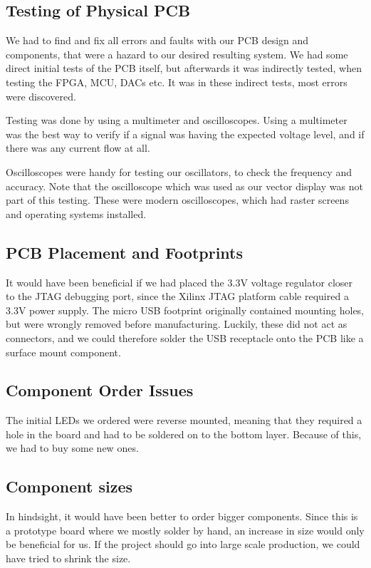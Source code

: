 \subsection{Testing of Physical PCB}
We had to find and fix all errors and faults with our PCB design and components, that were a hazard to our desired resulting system.  
We had some direct initial tests of the PCB itself, but afterwards it was indirectly tested, when testing the FPGA, MCU, DACs etc. It was in these indirect tests, most errors were discovered.

Testing was done by using a multimeter and oscilloscopes. Using a multimeter was the best way to verify if a signal was having the expected voltage level, and if there was any current flow at all.

Oscilloscopes were handy for testing our oscillators, to check the frequency and accuracy. Note that the oscilloscope which was used as our vector display was not part of this testing. These were modern oscilloscopes, which had raster screens and operating systems installed.

\subsection{PCB Placement and Footprints}


It would have been beneficial if we had placed the 3.3V voltage regulator closer to the JTAG debugging port, since the Xilinx JTAG platform cable required a 3.3V power supply.
\newline
\newline
The micro USB footprint originally contained mounting holes, but were wrongly removed before manufacturing. Luckily, these did not act as connectors, and we could therefore solder the USB receptacle onto the PCB like a surface mount component.

\subsection{Component Order Issues}
The initial LEDs we ordered were reverse mounted, meaning that they required a hole in the board and had to be soldered on to the bottom layer. Because of this, we had to buy some new ones.
\newline
\newline

\subsection{Component sizes}
In hindsight, it would have been better to order bigger components. Since this is a prototype board where we mostly solder by hand, an increase in size would only be beneficial for us. If the project should go into large scale production, we could have tried to shrink the size.